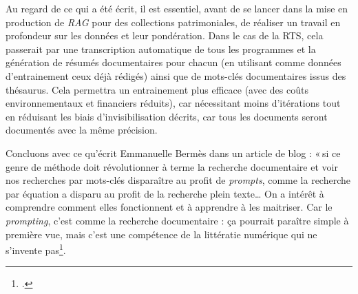 Au regard de ce qui a été écrit, il est essentiel, avant de se lancer dans la mise en production de \textit{RAG} pour des collections patrimoniales, de réaliser un travail en profondeur sur les données et leur pondération. Dans le cas de la RTS, cela passerait par une transcription automatique de tous les programmes et la génération de résumés documentaires pour chacun (en utilisant comme données d’entrainement ceux déjà rédigés) ainsi que de mots-clés documentaires issus des thésaurus. Cela permettra un entrainement plus efficace (avec des coûts environnementaux et financiers réduits), car nécessitant moins d’itérations tout en réduisant les biais d’invisibilisation décrits, car tous les documents seront documentés avec la même précision.

Concluons avec ce qu’écrit Emmanuelle Bermès dans un article de blog : « si ce genre de méthode doit révolutionner à terme la recherche documentaire et voir nos recherches par mots-clés disparaître au profit de \textit{prompts}, comme la recherche par équation a disparu au profit de la recherche plein texte… On a intérêt à comprendre comment elles fonctionnent et à apprendre à les maitriser. Car le \textit{prompting}, c’est comme la recherche documentaire : ça pourrait paraître simple à première vue, mais c’est une compétence de la littératie numérique qui ne s’invente pas\footcite{bermes_futur_2024}.

